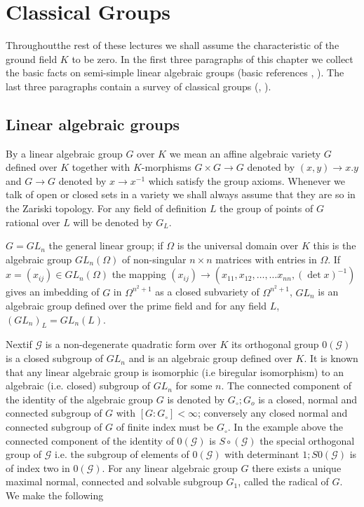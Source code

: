 

\chapter{Classical Groups}\label{chap2}%

Throughout\pageoriginale the rest of these lectures we shall assume the
characteristic of the ground field $K$ to be zero. In the first three
paragraphs of this chapter we collect the basic facts on semi-simple
linear algebraic groups (basic references \cite{keyC3}, \cite{keyD-G}). The last
three paragraphs contain a survey of classical groups
(\cite{keyDi}, \cite{keyW2}). 



\section{Linear algebraic groups}\label{chap2:sec2.1}

By a linear algebraic group $G$ over $K$ we mean an affine algebraic
variety $G$ defined over $K$ together with $K$-morphisms $G \times G
\rightarrow G$ denoted by $(x,y) \rightarrow x.y$ and $G \rightarrow
G$ denoted by $x \rightarrow x^{-1}$ which satisfy the group
axioms. Whenever we talk of  open or closed sets in a variety we
shall always assume that they are so in the Zariski topology. For any
field of definition $L$ the group of points of $G$ rational over $L$
will be denoted by $G_{L}$. 

\begin{example*}
$G = GL_n$ the general linear group; if $\Omega$ is the universal
  domain over $K$ this is the algebraic group $GL_n(\Omega)$ of
  non-singular $n \times n$ matrices with entries in $\Omega$. If $x
  = (x_{ij}) \in GL_n (\Omega)$ the mapping  $(x_{ij}) \rightarrow
  (x_{11},x_{12}, \ldots , \ldots x_{n n},(\det x)^{-1})$ gives an imbedding of
  $G$ in $\Omega^{n^2+1}$ as  a closed subvariety of  $\Omega^{n^2+1}$,
  $GL_n$ is an algebraic group defined over the prime field and for any
  field $L$, $(GL_n)_{L} = GL_n (L)$.  
\end{example*}

\noindent
Next\pageoriginale if $\mathscr{G}$ is a non-degenerate quadratic form
over $K$ its 
orthogonal group $0 (\mathscr{G})$ is a closed subgroup of $GL_n$ and
is an algebraic group defined over $K$. It is known that any linear
algebraic group is isomorphic (i.e biregular isomorphism) to an
algebraic (i.e. closed) subgroup of $GL_n$  for some $n$. The
connected component of the  identity of the algebraic group $G$ is
denoted by $G_\circ ; G_o$ is a closed, normal and connected  subgroup of
$G$ with $[G:G_\circ] < \infty $; conversely any closed normal and
connected subgroup of $G$ of finite index must be $G_\circ$. In the
example above the connected component of the identity of $0 (
\mathscr{G} )$ is $ S \circ (\mathscr{G}) $ the special orthogonal group
of $\mathscr{G}$ i.e. the subgroup of elements of $0(\mathscr{G})$
with determinant $1; S 0 ( \mathscr{G}) $ is of index two in $0
(\mathscr{G})$. For any linear algebraic group $G$ there exists a
unique  maximal normal, connected and solvable subgroup $G_1$, called
the radical of $G$. We make the following 

